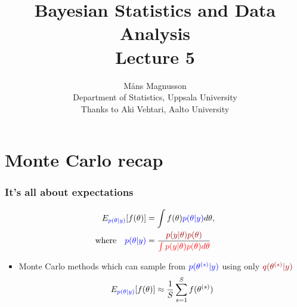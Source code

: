 \documentclass[10pt]{beamer}
\title[]{{\color{black}Bayesian Statistics and Data Analysis \\ Lecture 5}}
\author[]{M{\aa}ns Magnusson \\ Department of Statistics, Uppsala University \\ Thanks to Aki Vehtari, Aalto University}
\date{}
\begin{document}
\frame{\titlepage
}



\section{Monte Carlo recap}


\begin{frame}

\frametitle{ It's all about expectations}

  \vspace{-1.5\baselineskip}
   \begin{align*}
     E_{\color{blue} p(\theta|y)}[f(\theta)] & = \int f(\theta) {\color{blue} p(\theta|y)} d\theta,\\
     \text{where} \quad
     {\color{blue} p(\theta|y)} & = \frac{\color{uured}p(y|\theta)p(\theta)}{\color{red} \int p(y|\theta)p(\theta) d\theta}
   \end{align*}

 \begin{itemize}
   \vspace{-0.5\baselineskip}
    \item<4-> Monte Carlo methods which can sample from
      ${\color{blue}p(\theta^{(s)}|y)}$ using only
      ${\color{uured}q(\theta^{(s)}|y)}$
         \vspace{-0.5\baselineskip}
      \begin{align*}
        E_{\color{blue} p(\theta|y)}[f(\theta)] \approx \frac{1}{S} \sum_{s=1}^S f(\theta^{(s)})
      \end{align*}
    \end{itemize}

\end{frame}
\end{document}

